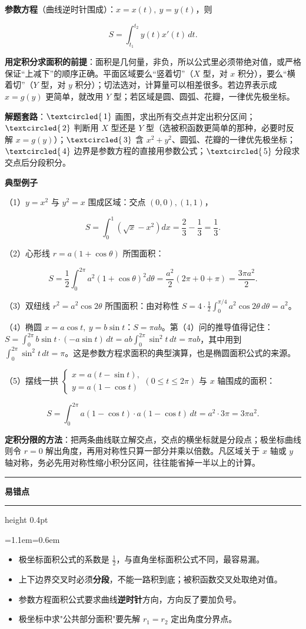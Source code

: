\documentclass[11pt,openany,UTF8]{ctexbook}
\newcommand{\circled}[1]{\textcircled{\scriptsize\,#1}}
\newcommand{\callouthead}[2]{%
  \par\addvspace{7pt}\noindent
  {\color{#1}\rule[-0.15em]{3pt}{1.05em}}\hspace{0.5em}%
  {\bfseries\color{#1}#2}\par\nobreak\vspace{-0.35em}%
  {\color{rulesep}\hrule height 0.4pt}\nobreak\vspace{0.45em}%
  \begingroup\small\setlength{\parindent}{0pt}%
  \leftskip=1.1em\rightskip=0.6em\noindent\ignorespaces}
\newcommand{\calloutend}{\par\endgroup\addvspace{7pt}}
\newenvironment{callwarn}[1]{\callouthead{warnbar}{#1}}{\calloutend}
\begin{document}
\textbf{参数方程}（曲线逆时针围成）：$x=x(t),\ y=y(t)$，则

\[S=\int_{t_1}^{t_2}y(t)x'(t)\,dt.\]

\textbf{用定积分求面积的前提}：面积是几何量，非负，所以公式里必须带绝对值，或严格保证“上减下”的顺序正确。平面区域要么“竖着切”（$X$ 型，对 $x$ 积分），要么“横着切”（$Y$ 型，对 $y$ 积分）；切法选对，计算量可以相差很多。若边界表示成 $x=g(y)$ 更简单，就改用 $Y$ 型；若区域是圆、圆弧、花瓣，一律优先极坐标。

\textbf{解题套路}：$\circled{1}$ 画图，求出所有交点并定出积分区间；$\circled{2}$ 判断用 $X$ 型还是 $Y$ 型（选被积函数更简单的那种，必要时反解 $x=g(y)$）；$\circled{3}$ 含 $x^2+y^2$、圆弧、花瓣的一律优先极坐标；$\circled{4}$ 边界是参数方程的直接用参数公式；$\circled{5}$ 分段求交点后分段积分。

\textbf{典型例子}

（1）$y=x^2$ 与 $y^2=x$ 围成区域：交点 $(0,0),(1,1)$，

\[S=\int_0^1\left(\sqrt{x}-x^2\right)dx=\frac{2}{3}-\frac{1}{3}=\frac{1}{3}.\]

（2）心形线 $r=a(1+\cos\theta)$ 所围面积：

\[S=\frac{1}{2}\int_0^{2\pi}a^2(1+\cos\theta)^2d\theta=\frac{a^2}{2}\left(2\pi+0+\pi\right)=\frac{3\pi a^2}{2}.\]

（3）双纽线 $r^2=a^2\cos 2\theta$ 所围面积：由对称性 $S=4\cdot\frac{1}{2}\int_0^{\pi/4}a^2\cos2\theta\,d\theta=a^2$。

（4）椭圆 $x=a\cos t,\ y=b\sin t$：$S=\pi ab$。第（4）问的推导值得记住：$S=\int_0^{2\pi}b\sin t\cdot(-a\sin t)\,dt=ab\int_0^{2\pi}\sin^2t\,dt=\pi ab$，其中用到 $\int_0^{2\pi}\sin^2t\,dt=\pi$。这是参数方程求面积的典型演算，也是椭圆面积公式的来源。

（5）摆线一拱 $\begin{cases}x=a(t-\sin t),\\ y=a(1-\cos t)\end{cases}(0\leq t\leq2\pi)$ 与 $x$ 轴围成的面积：

\[S=\int_0^{2\pi}a(1-\cos t)\cdot a(1-\cos t)\,dt=a^2\cdot3\pi=3\pi a^2.\]

\textbf{定积分限的方法}：把两条曲线联立解交点，交点的横坐标就是分段点；极坐标曲线则令 $r=0$ 解出角度，再用对称性只算一部分并乘以倍数。凡区域关于 $x$ 轴或 $y$ 轴对称，务必先用对称性缩小积分区间，往往能省掉一半以上的计算。

\begin{callwarn}{易错点}
\begin{itemize}
\item 极坐标面积公式的系数是 $\frac{1}{2}$，与直角坐标面积公式不同，最容易漏。
\item 上下边界交叉时必须\textbf{分段}，不能一路积到底；被积函数交叉处取绝对值。
\item 参数方程面积公式要求曲线\textbf{逆时针}方向，方向反了要加负号。
\item 极坐标中求"公共部分面积"要先解 $r_1=r_2$ 定出角度分界点。
\end{itemize}
\end{callwarn}
\end{document}
